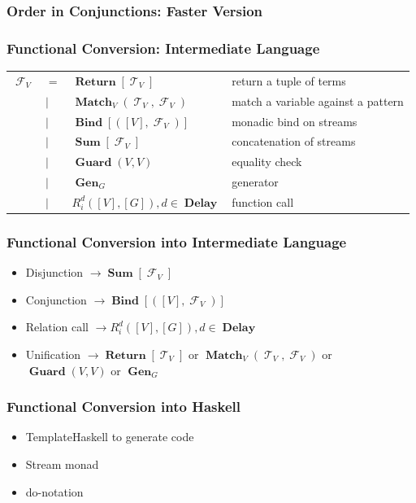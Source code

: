 \documentclass[xcolor=table]{beamer}
\DeclareMathOperator{\Term}{\mathcal{T}}
\DeclareMathOperator{\Delay}{\mathbf{Delay}}
\DeclareMathOperator{\Fun}{\mathcal{F}}
\DeclareMathOperator{\Rtrn}{\mathbf{Return}}
\DeclareMathOperator{\Bind}{\mathbf{Bind}}
\DeclareMathOperator{\Match}{\mathbf{Match}}
\DeclareMathOperator{\Sum}{\mathbf{Sum}}
\DeclareMathOperator{\Guard}{\mathbf{Guard}}
\DeclareMathOperator{\Gen}{\mathbf{Gen}}
\newcommand{\LIST}[1]{\left[ #1 \right]}
\begin{document}
\begin{frame}[fragile]
  \frametitle{Order in Conjunctions: Faster Version}
  
\end{frame}

\begin{frame}[fragile]
  \frametitle{Functional Conversion: Intermediate Language}
\begin{tabular}{llll}
    $\Fun_{V}$ & $=$ &  $\Rtrn \LIST{\Term_{V}}$ & return a tuple of terms\\
               & $\mid$ &  $\Match_{V} \left( \Term_{V}, \Fun_{V} \right)$& match a variable against a pattern\\
               & $\mid$ & $\Bind\LIST{\left(\LIST{V}, \Fun_{V}\right)} $ & monadic bind on streams\\
               & $\mid$ & $\Sum\LIST{\Fun_{V}}$ & concatenation of streams\\
               & $\mid$ & $\Guard\left( V, V \right)$ & equality check\\
               & $\mid$ & $\Gen_{G}$ & generator\\
               & $\mid$ & $R_{i}^{d}(\LIST{V}, \LIST{G}), d\in \Delay $ & function call
\end{tabular}
\end{frame}

\begin{frame}[fragile]
  \frametitle{Functional Conversion into Intermediate Language}
\begin{itemize}
  \item Disjunction $\rightarrow \Sum\LIST{\Fun_{V}}$
  \item Conjunction $\rightarrow \Bind\LIST{\left(\LIST{V}, \Fun_{V}\right)}$
  \item Relation call $\rightarrow R_{i}^{d}(\LIST{V}, \LIST{G}), d\in \Delay$
  \item Unification $\rightarrow \Rtrn \LIST{\Term_{V}}$ or $\Match_{V} \left( \Term_{V}, \Fun_{V} \right)$ or $\Guard\left( V, V \right)$ or $\Gen_{G}$
\end{itemize}
\end{frame}

\begin{frame}[fragile]
  \frametitle{Functional Conversion into Haskell}
  \begin{itemize}
    \item TemplateHaskell to generate code
    \item Stream monad
    \item do-notation
  \end{itemize}
\end{frame}
\end{document}
